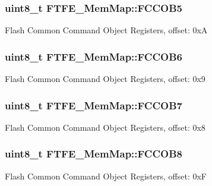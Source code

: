 \subsubsection[{F\+C\+C\+O\+B5}]{\setlength{\rightskip}{0pt plus 5cm}uint8\+\_\+t F\+T\+F\+E\+\_\+\+Mem\+Map\+::\+F\+C\+C\+O\+B5}\label{struct_f_t_f_e___mem_map_a07c24a4727fa6aef7cb9a3119c5bf39a}
Flash Common Command Object Registers, offset\+: 0x\+A \hypertarget{struct_f_t_f_e___mem_map_a4c1e73e990e9c1b2db59498c66edf114}{}
\subsubsection[{F\+C\+C\+O\+B6}]{\setlength{\rightskip}{0pt plus 5cm}uint8\+\_\+t F\+T\+F\+E\+\_\+\+Mem\+Map\+::\+F\+C\+C\+O\+B6}\label{struct_f_t_f_e___mem_map_a4c1e73e990e9c1b2db59498c66edf114}
Flash Common Command Object Registers, offset\+: 0x9 \hypertarget{struct_f_t_f_e___mem_map_ab092d215fb23493ba64935d87da1cf73}{}
\subsubsection[{F\+C\+C\+O\+B7}]{\setlength{\rightskip}{0pt plus 5cm}uint8\+\_\+t F\+T\+F\+E\+\_\+\+Mem\+Map\+::\+F\+C\+C\+O\+B7}\label{struct_f_t_f_e___mem_map_ab092d215fb23493ba64935d87da1cf73}
Flash Common Command Object Registers, offset\+: 0x8 \hypertarget{struct_f_t_f_e___mem_map_a7d553598d8cffb93c687bce40e59a0ef}{}
\subsubsection[{F\+C\+C\+O\+B8}]{\setlength{\rightskip}{0pt plus 5cm}uint8\+\_\+t F\+T\+F\+E\+\_\+\+Mem\+Map\+::\+F\+C\+C\+O\+B8}\label{struct_f_t_f_e___mem_map_a7d553598d8cffb93c687bce40e59a0ef}
Flash Common Command Object Registers, offset\+: 0x\+F \hypertarget{struct_f_t_f_e___mem_map_abd479b210960b55ac943bdc01be221c1}{}
